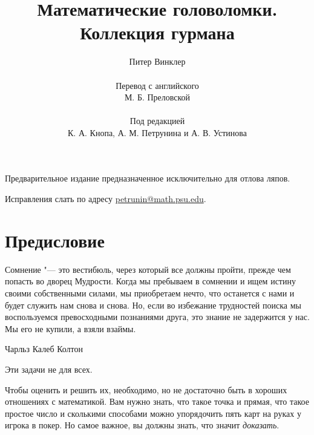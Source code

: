 \documentclass[twoside]{book}
\begin{document}

\title{Математические головоломки.\\
Коллекция гурмана}
\author{Питер Винклер\\
\\
Перевод с английского 
\\
М. Б. Преловской
\\
\\
Под редакцией
\\
К. А. Кнопа, 
А. М. Петрунина и 
А. В. Устинова
}
\date{}
\maketitle

\thispagestyle{empty}

Предварительное издание предназначенное исключительно для отлова ляпов. 

Исправления слать по адресу 
\url{petrunin@math.psu.edu}.


\vfill


\newcommand{\kk}[1]{\begingroup\color{brown}KK:~#1\endgroup}
\newcommand{\au}[1]{\begingroup\color{brown}AU:~#1\endgroup}




\chapter{Предисловие}

\setlength{\epigraphwidth}{.8\textwidth} %
\epigraph{Сомнение "--- это вестибюль, через который все должны пройти, прежде чем попасть во дворец Мудрости.
Когда мы пребываем в сомнении и ищем истину своими собственными силами, мы приобретаем нечто, что останется с нами и будет служить нам снова и снова.
Но, если во избежание трудностей поиска мы воспользуемся превосходными познаниями друга, это знание не задержится у нас.
Мы его не купили, а взяли взаймы.}{Чарльз Калеб Колтон}
                                                                                     

Эти задачи не для всех.

Чтобы оценить и решить их, необходимо, но не достаточно быть в хороших отношениях с математикой.
Вам нужно знать, что такое точка и прямая, что такое простое число и сколькими способами можно упорядочить пять карт на руках у игрока в покер.
Но самое важное, вы должны знать, что значит \emph{доказать}.
\end{document}
